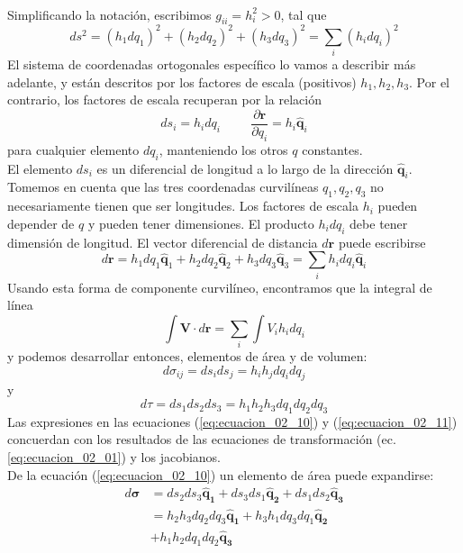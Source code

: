 \\
Simplificando la notación, escribimos $g_{ii} = h_{i}^{2} > 0$, tal que
\begin{equation}
ds^{2} = (h_{1} dq_{1})^{2} + (h_{2} dq_{2})^{2} + (h_{3} dq_{3})^{2} = \sum_{i} (h_{i} dq_{i})^{2} 
\label{eq:ecuacion_02_08}
\end{equation}
El sistema de coordenadas ortogonales específico lo vamos a describir más adelante, y están descritos por los factores de escala (positivos) $h_{1}, h_{2}, h_{3}$. Por el contrario, los factores de escala recuperan por la relación
\begin{equation}
ds_{i} = h_{i} dq_{i} \hspace{1cm} \dfrac{\partial \mathbf{r}}{\partial q_{i}} = h_{i} \mathbf{\widehat{q}}_{i} 
\label{eq:ecuacion_02_09}
\end{equation}
para cualquier elemento $dq_{i}$, manteniendo los otros $q$ constantes.
\\
El elemento $ds_{i}$ es un diferencial de longitud a lo largo de la dirección $\mathbf{\widehat{q}}_{i}$. Tomemos en cuenta que las tres coordenadas curvilíneas $q_{1},q_{2},q_{3}$ no necesariamente tienen  que ser longitudes. Los factores de escala $h_{i}$ pueden depender de $q$ y pueden tener dimensiones. El producto $h_{i}dq_{i}$ debe tener dimensión de longitud. El vector diferencial de distancia $d\mathbf{r}$ puede escribirse
\[ d \mathbf{r} =  h_{1} dq_{1} \mathbf{\widehat{q}}_{1} + h_{2} dq_{2} \mathbf{\widehat{q}}_{2} + h_{3} dq_{3} \mathbf{\widehat{q}}_{3} = \sum_{i} h_{i} dq_{i} \mathbf{\widehat{q}}_{i}  \]
Usando esta forma de componente curvilíneo, encontramos que la integral de línea
\[ \int \mathbf{V} \cdot d \mathbf{r} = \sum_{i} \int V_{i} h_{i} dq_{i}  \]
y podemos desarrollar entonces, elementos de área y de volumen:
\begin{equation}
d \sigma_{ij} = ds_{i} ds_{j} =  h_{i} h_{j} dq_{i} dq_{j}
\label{eq:ecuacion_02_10}
\end{equation}
y
\begin{equation}
d \tau = ds_{1} ds_{2} ds_{3} =  h_{1} h_{2} h_{3} dq_{1} dq_{2} dq_{3}
\label{eq:ecuacion_02_11}
\end{equation}
Las expresiones en las ecuaciones (\ref{eq:ecuacion_02_10}) y (\ref{eq:ecuacion_02_11}) concuerdan con los resultados de las ecuaciones de transformación (ec. \ref{eq:ecuacion_02_01}) y los jacobianos.
\\
De la ecuación (\ref{eq:ecuacion_02_10}) un elemento de área puede expandirse:
\[ \begin{split}
d \bm{\sigma} &= ds_{2} ds_{3} \mathbf{\widehat{q}_{1}} + ds_{3} ds_{1} \mathbf{\widehat{q}_{2}} + ds_{1} ds_{2} \mathbf{\widehat{q}_{3}} \\
&= h_{2} h_{3} d q_{2} d q_{3} \mathbf{\widehat{q}_{1}} + h_{3} h_{1} d q_{3} d q_{1} \mathbf{\widehat{q}_{2}} \\
&+ h_{1} h_{2} d q_{1} d q_{2} \mathbf{\widehat{q}_{3}}
\end{split} \]
